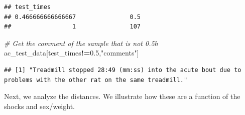 \documentclass[]{article}
\newenvironment{Shaded}{\begin{snugshade}}{\end{snugshade}}
\newcommand{\FloatTok}[1]{\textcolor[rgb]{0.00,0.00,0.81}{#1}}
\newcommand{\StringTok}[1]{\textcolor[rgb]{0.31,0.60,0.02}{#1}}
\newcommand{\CommentTok}[1]{\textcolor[rgb]{0.56,0.35,0.01}{\textit{#1}}}
\newcommand{\OperatorTok}[1]{\textcolor[rgb]{0.81,0.36,0.00}{\textbf{#1}}}
\newcommand{\NormalTok}[1]{#1}
\begin{document}
\begin{verbatim}
## test_times
## 0.466666666666667               0.5 
##                 1               107
\end{verbatim}

\begin{Shaded}
\begin{Highlighting}[]
\CommentTok{# Get the comment of the sample that is not 0.5h}
\NormalTok{ac_test_data[test_times}\OperatorTok{!=}\FloatTok{0.5}\NormalTok{,}\StringTok{"comments"}\NormalTok{]}
\end{Highlighting}
\end{Shaded}

\begin{verbatim}
## [1] "Treadmill stopped 28:49 (mm:ss) into the acute bout due to problems with the other rat on the same treadmill."
\end{verbatim}

\begin{Shaded}
\end{Shaded}

Next, we analyze the distances. We illustrate how these are a function
of the shocks and sex/weight.
\end{document}

